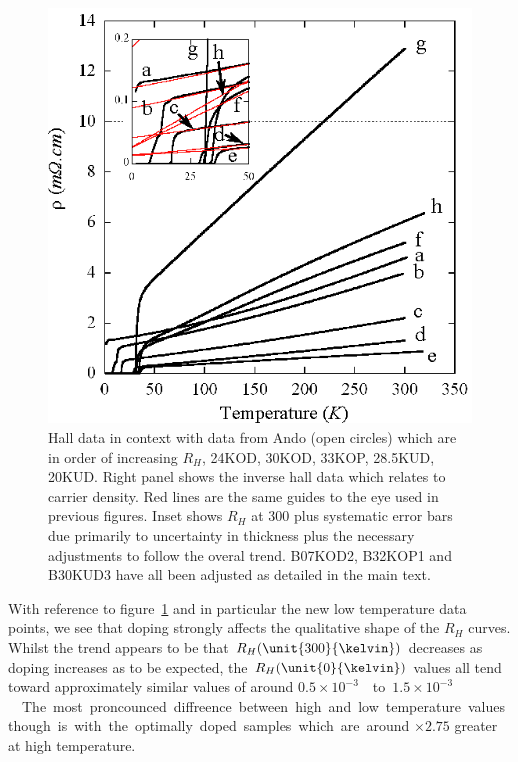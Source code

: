 \begin{figure}[htbp]
	\begin{center}
		\includegraphics[scale=1.1]{Chapter-HallBSCO/Figures/InvHallCombined/InvHallCombined}
		\caption{Hall data in context with data from Ando \etal\cite{Ando1999} (open circles) which are in order of increasing $R_H$, 24KOD, 30KOD, 33KOP, 28.5KUD, 20KUD. Right panel shows the inverse hall data which relates to carrier density. Red lines are the same guides to the eye used in previous figures. Inset shows $R_H$ at \unit{300}{\kelvin} plus systematic error bars due primarily to uncertainty in thickness plus the necessary adjustments to follow the overal trend. B07KOD2, B32KOP1 and B30KUD3 have all been adjusted as detailed in the main text.}
		\label{Fig:ExpH:InvHallCombined}
	\end{center}
\end{figure}

With reference to figure~\ref{Fig:ExpH:InvHallCombined} and in particular the new low temperature data points, we see that doping strongly affects the qualitative shape of the $R_H$ curves. Whilst the trend appears to be that $R_H(\unit{300}{\kelvin})$ decreases as doping increases as to be expected, the $R_H(\unit{0}{\kelvin})$ values all tend toward approximately similar values of around \unit{$0.5\times 10^{-3}$}{\centi\metre\cubed}to \unit{$1.5\times 10^{-3}$}{\centi\metre\cubed}. The most proncounced diffreence between high and low temperature values though is with the optimally doped samples which are around $\times 2.75$ greater at high temperature.

